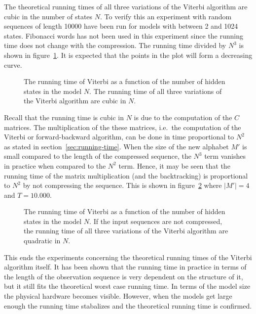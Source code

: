 The theoretical running times of all three variations of the Viterbi algorithm
are cubic in the number of states $N$. To verify this an experiment with random
sequences of length 10000 have been run for models with between 2 and 1024
states. Fibonacci words has not been used in this experiment since the running
time does not change with the compression. The running time divided by $N^3$ is
shown in figure~\ref{fig:assymptotic_viterbi_backtrack_N}. It is expected that
the points in the plot will form a decreasing curve. 

\begin{figure}
  \centering
  
  \caption{The running time of Viterbi as a function of the number of hidden
    states in the model $N$. The running time of all three variations of the Viterbi
    algorithm are cubic in $N$.}
  \label{fig:assymptotic_viterbi_backtrack_N}
\end{figure}

Recall that the running time is cubic in $N$ is due to the computation of the
$C$ matrices. The multiplication of the these matrices, i.e.\ the computation
of the Viterbi or forward-backward algorithm, can be done in time
proportional to $N^2$ as stated in section~\ref{sec:running-time}. When the
size of the new alphabet $M'$ is small compared to the length of the compressed
sequence, the $N^3$ term vanishes in practice when compared to the $N^2$
term. Hence, it may be seen that the running time of the matrix multiplication
(and the backtracking) is proportional to $N^2$ by not compressing the
sequence. This is shown in figure~\ref{fig:assymptotic_viterbi_N} where
$\lvert M' \rvert = 4$ and $T = 10.000$.

\begin{figure}
  \centering
  
  \caption{The running time of Viterbi as a function of the number of hidden
    states in the model $N$. If the input sequences are not compressed, the
    running time of all three variations of the Viterbi algorithm are quadratic
    in $N$.}
  \label{fig:assymptotic_viterbi_N}
\end{figure}

This ends the experiments concerning the theoretical running times of the
Viterbi algorithm itself. It has been shown that the running time in practice
in terms of the length of the observation sequence is very dependent on the
structure of it, but it still fits the theoretical worst case running time. In
terms of the model size the physical hardware becomes visible. However, when
the models get large enough the running time stabalizes and the theoretical
running time is confirmed.

